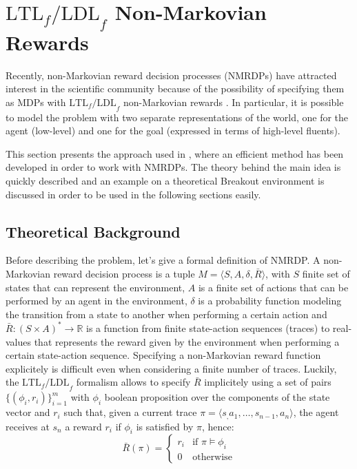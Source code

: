 \section{$\text{LTL}_f\text{/LDL}_f$ Non-Markovian Rewards}
\label{section:nonmarkovianrewards}
Recently, non-Markovian reward decision processes (NMRDPs)
have attracted interest in the scientific community because of the possibility
of specifying them as MDPs with $\text{LTL}_f\text{/LDL}_f$ non-Markovian
rewards \cite{DBLP:journals/corr/abs-1807-06333}. In particular, it is possible
to model the problem with two separate representations of the world, one for
the agent (low-level) and one for the goal (expressed in terms of high-level
fluents).

This section presents the approach used in
\cite{DBLP:journals/corr/abs-1807-06333}, where an efficient method has been
developed in order to work with NMRDPs. The theory behind the main idea is
quickly described and an example on a theoretical Breakout environment is
discussed in order to be used in the following sections easily.

\subsection{Theoretical Background}
Before describing the problem, let's give a formal definition of NMRDP.
A non-Markovian reward decision process is a tuple $M = \langle S, A, \delta,
\bar{R} \rangle$, with $S$ finite set of states that can represent the
environment, $A$ is a finite set of actions that can be performed by an agent
in the environment, $\delta$ is a probability function modeling
the transition from a state to another when performing a certain action and
$\bar{R}: (S \times A)^* \rightarrow \mathbb{R}$ is a function from
finite state-action sequences (traces) to real-values that represents the
reward given by the environment when performing a certain state-action
sequence. Specifying a non-Markovian reward function explicitely is
difficult even when considering a finite number of traces. Luckily, the
$\text{LTL}_f\text{/LDL}_f$ formalism allows to specify $\bar{R}$
implicitely using a set of pairs $\{ (\phi_i, r_i) \}_{i=1}^m$ with
$\phi_i$ boolean
proposition over the components of the state vector and $r_i$ such that,
given a current trace $\pi = \langle s_, a_1, \dots, s_{n-1}, a_n \rangle$,
the agent receives at $s_n$ a reward $r_i$ if $\phi_i$ is satisfied by $\pi$,
hence:
\begin{equation}
    \bar{R}(\pi) =
        \begin{cases}
            r_i & \text{if } \pi \vDash \phi_i \\
            0 & \text{otherwise}
        \end{cases}
\end{equation}

